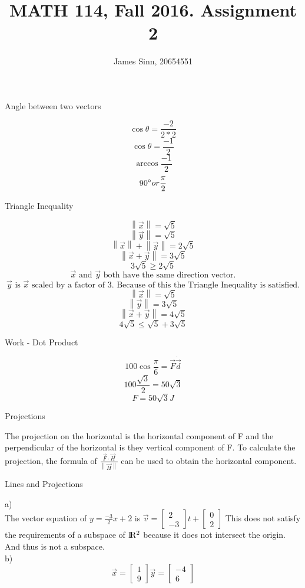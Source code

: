 \documentclass[12pt]{article}
\newcommand{\dbarl}{\left\lVert}
\newcommand{\dbarr}{\right\rVert}
\newenvironment{problem}[2][Problem]{\begin{trivlist}
\item[\hskip \labelsep {\bfseries #1}\hskip \labelsep {\bfseries #2.}]}{\end{trivlist}}
\begin{document}

\title{MATH 114, Fall 2016. Assignment 2}
\author{James Sinn, 20654551}
\maketitle

\begin{problem}{1}
	Angle between two vectors
\end{problem}
	\[\cos\theta = \frac{-2}{2*2}\]
	\[\cos\theta = \frac {-1}{2}\]
	\[\arccos{\frac{-1}{2}}\]
	\[90\degree or \frac{\pi}{2}\]
\begin{problem}{2}
	Triangle Inequality
\end{problem}
	\[\dbarl\vec x\dbarr = \sqrt{5}\]
	\[\dbarl\vec y\dbarr = \sqrt{5}\]
	\[\dbarl\vec x\dbarr + \dbarl\vec y\dbarr = 2\sqrt{5}\]
	\[\dbarl\vec x + \vec y \dbarr = 3\sqrt{5}\]
	\[3\sqrt{5} \geq 2\sqrt{5}\]
	\[\vec x \text{ and } \vec y  \text{ both have the same direction vector.}\]
	\[\vec y \text{ is } \vec x \text{ scaled by a factor of 3. Because of this the Triangle Inequality is satisfied.}\]
	\[\dbarl \vec x\dbarr = \sqrt{5}\]
	\[\dbarl \vec y\dbarr = 3\sqrt{5}\]
	\[\dbarl \vec x + \vec y\dbarr = 4\sqrt{5}\]
	\[ 4\sqrt{5} \leq \sqrt{5} + 3\sqrt{5} \]
\begin{problem}{3}
	Work - Dot Product
\end{problem}
	\[ 100\cos{\frac{\pi}{6}} = \vec F \dot \vec d \]
	\[ 100\frac{\sqrt{3}}{2} = 50\sqrt{3}\]
	\[F = 50\sqrt{3}J\] 
\begin{problem}{4}
	Projections
\end{problem}
	The projection on the horizontal is the horizontal component of F and the perpendicular of the horizontal is they vertical component of F.
	To calculate the projection, the formula of $\frac{\vec F \cdot \vec H}{\dbarl \vec H \dbarr}$ can be used to obtain the horizontal component. 
\begin{problem}{5}
	Lines and Projections
\end{problem}
a)\\
	The vector equation of $ y=\frac{-3}{2}x + 2$  is 
	$ \vec v = \left[\begin{matrix} 2\\-3 \end{matrix}\right]t + \left[\begin{matrix} 0\\2 \end{matrix}\right] $
	This does not satisfy the requirements of a subspace of $ \rm I\!R^2 $ because it does not intersect the origin. And thus is not a subspace.\\
b)\\
	\[\vec x = \left[\begin{matrix} 1\\9\end{matrix}\right] \vec y = \left[\begin{matrix} -4\\6\end{matrix}\right]\]
\end{document}
